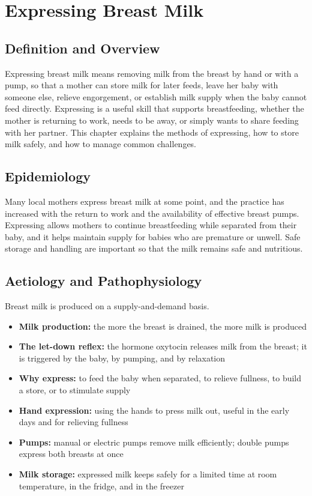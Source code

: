 \chapter{Expressing Breast Milk}

\section*{Definition and Overview}
Expressing breast milk means removing milk from the breast by hand or with a pump, so that a mother can store milk for later feeds, leave her baby with someone else, relieve engorgement, or establish milk supply when the baby cannot feed directly. Expressing is a useful skill that supports breastfeeding, whether the mother is returning to work, needs to be away, or simply wants to share feeding with her partner. This chapter explains the methods of expressing, how to store milk safely, and how to manage common challenges.

\section*{Epidemiology}
Many local mothers express breast milk at some point, and the practice has increased with the return to work and the availability of effective breast pumps. Expressing allows mothers to continue breastfeeding while separated from their baby, and it helps maintain supply for babies who are premature or unwell. Safe storage and handling are important so that the milk remains safe and nutritious.

\section*{Aetiology and Pathophysiology}
Breast milk is produced on a supply-and-demand basis.
\begin{itemize}
    \item \textbf{Milk production:} the more the breast is drained, the more milk is produced
    \item \textbf{The let-down reflex:} the hormone oxytocin releases milk from the breast; it is triggered by the baby, by pumping, and by relaxation
    \item \textbf{Why express:} to feed the baby when separated, to relieve fullness, to build a store, or to stimulate supply
    \item \textbf{Hand expression:} using the hands to press milk out, useful in the early days and for relieving fullness
    \item \textbf{Pumps:} manual or electric pumps remove milk efficiently; double pumps express both breasts at once
    \item \textbf{Milk storage:} expressed milk keeps safely for a limited time at room temperature, in the fridge, and in the freezer
\end{itemize}


